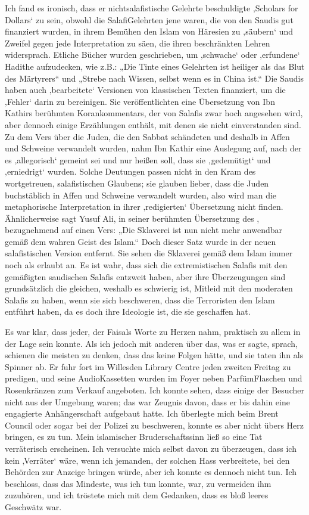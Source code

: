 \documentclass[12pt]{memoir}
\begin{document}
Ich fand es ironisch,
dass er nicht\–salafistische Gelehrte beschuldigte
‚Scholars for Dollars‘ zu sein,
obwohl die Salafi\–Gelehrten jene waren,
die von den Saudis gut finanziert wurden,
in ihrem Bemühen den Islam von Häresien zu ‚säubern‘
und Zweifel gegen jede Interpretation zu säen,
die ihren beschränkten Lehren widersprach.
Etliche Bücher wurden geschrieben,
um ‚schwache‘ oder ‚erfundene‘ Hadithe aufzudecken, wie z.B.:
„Die Tinte eines Gelehrten ist heiliger als das Blut des Märtyrers“
und „Strebe nach Wissen, selbst wenn es in China ist.“
Die Saudis haben auch ‚bearbeitete‘ Versionen
von klassischen Texten finanziert, um die ‚Fehler‘ darin zu bereinigen.
Sie veröffentlichten eine Übersetzung
von Ibn Kathirs berühmten Korankommentars,
der von Salafis zwar hoch angesehen wird,
aber dennoch einige Erzählungen enthält,
mit denen sie nicht einverstanden sind.
Zu dem Vers über die Juden, die den Sabbat schändeten
und deshalb in Affen und Schweine verwandelt wurden,
nahm Ibn Kathir eine Auslegung auf,
nach der es ‚allegorisch‘ gemeint sei und nur heißen soll,
dass sie ‚gedemütigt‘ und ‚erniedrigt‘ wurden.
Solche Deutungen passen nicht in den Kram
des wortgetreuen, salafistischen Glaubens;
sie glauben lieber, dass die Juden buchstäblich
in Affen und Schweine verwandelt wurden,
also wird man die metaphorische Interpretation
in ihrer ‚redigierten‘ Übersetzung nicht finden.
Ähnlicherweise sagt Yusuf Ali,
in seiner berühmten Übersetzung des \Quran,
bezugnehmend auf einen Vers:
„Die Sklaverei ist nun nicht mehr anwendbar gemäß dem wahren Geist des Islam.“
Doch dieser Satz wurde in der neuen salafistischen Version entfernt.
Sie sehen die Sklaverei gemäß dem Islam immer noch als erlaubt an.
Es ist wahr, dass sich die extremistischen Salafis
mit den gemäßigten saudischen Salafis entzweit haben,
aber ihre Überzeugungen sind grundsätzlich die gleichen,
weshalb es schwierig ist, Mitleid mit den moderaten Salafis zu haben,
wenn sie sich beschweren, dass die Terroristen den Islam entführt haben,
da es doch ihre Ideologie ist, die sie geschaffen hat.

Es war klar, dass jeder, der Faisals Worte zu Herzen nahm,
praktisch zu allem in der Lage sein konnte.
Als ich jedoch mit anderen über das, was er sagte, sprach,
schienen die meisten zu denken, dass das keine Folgen hätte,
und sie taten ihn als Spinner ab.
Er fuhr fort im Willesden Library Centre jeden zweiten Freitag zu predigen,
und seine Audio\–Kassetten wurden im Foyer
neben Parfüm\–Flaschen und Rosenkränzen zum Verkauf angeboten.
Ich konnte sehen, dass einige der Besucher nicht aus der Umgebung waren;
das war Zeugnis davon, dass er bis dahin
eine engagierte Anhängerschaft aufgebaut hatte.
Ich überlegte mich beim Brent Council oder sogar bei der Polizei zu beschweren,
konnte es aber nicht übers Herz bringen, es zu tun.
Mein islamischer Bruderschaftssinn
ließ so eine Tat verräterisch erscheinen.
Ich versuchte mich selbst davon zu überzeugen,
dass ich kein ‚Verräter‘ wäre,
wenn ich jemanden, der solchen Hass verbreitete,
bei den Behörden zur Anzeige bringen würde,
aber ich konnte es dennoch nicht tun.
Ich beschloss, dass das Mindeste, was ich tun konnte, war,
zu vermeiden ihm zuzuhören,
und ich tröstete mich mit dem Gedanken,
dass es bloß leeres Geschwätz war.
\end{document}
